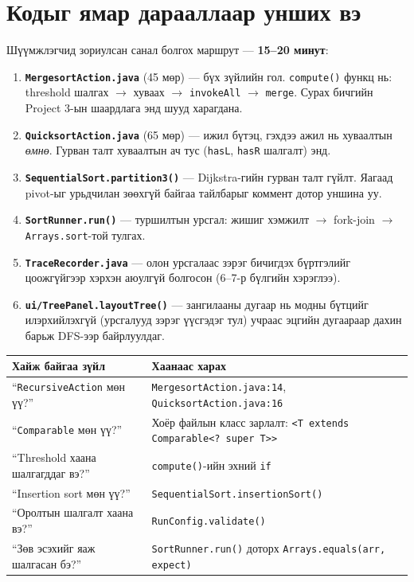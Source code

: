 \documentclass[11pt,a4paper]{article}
\begin{document}
\section{Кодыг ямар дарааллаар унших вэ}

Шүүмжлэгчид зориулсан санал болгох маршрут --- \textbf{15--20 минут}:

\begin{enumerate}[leftmargin=*,itemsep=3pt]
  \item \textbf{\texttt{MergesortAction.java}} (45 мөр) --- бүх зүйлийн гол.
        \texttt{compute()} функц нь: threshold шалгах $\to$ хуваах $\to$
        \texttt{invokeAll} $\to$ \texttt{merge}. Сурах бичгийн Project 3-ын
        шаардлага энд шууд харагдана.
  \item \textbf{\texttt{QuicksortAction.java}} (65 мөр) --- ижил бүтэц, гэхдээ
        ажил нь хуваалтын \emph{өмнө}. Гурван талт хуваалтын ач тус
        (\texttt{hasL}, \texttt{hasR} шалгалт) энд.
  \item \textbf{\texttt{SequentialSort.partition3()}} --- Dijkstra-гийн гурван
        талт гүйлт. Яагаад pivot-ыг урьдчилан зөөхгүй байгаа тайлбарыг
        коммент дотор уншина уу.
  \item \textbf{\texttt{SortRunner.run()}} --- туршилтын урсгал:
        жишиг хэмжилт $\to$ fork-join $\to$ \texttt{Arrays.sort}-той тулгах.
  \item \textbf{\texttt{TraceRecorder.java}} --- олон урсгалаас зэрэг бичигдэх
        бүртгэлийг цоожгүйгээр хэрхэн аюулгүй болгосон (6--7-р бүлгийн хэрэглээ).
  \item \textbf{\texttt{ui/TreePanel.layoutTree()}} --- зангилааны дугаар нь
        модны бүтцийг илэрхийлэхгүй (урсгалууд зэрэг үүсгэдэг тул) учраас
        эцгийн дугаараар дахин барьж DFS-ээр байрлуулдаг.
\end{enumerate}

\begin{center}
\small
\begin{tabular}{L{5.0cm}L{9.5cm}}
\toprule
Хайж байгаа зүйл & Хаанаас харах \\
\midrule
``\texttt{RecursiveAction} мөн үү?'' & \texttt{MergesortAction.java:14},
\texttt{QuicksortAction.java:16} \\
``\texttt{Comparable} мөн үү?'' & Хоёр файлын класс зарлалт:
\texttt{<T extends Comparable<? super T>>} \\
``Threshold хаана шалгагддаг вэ?'' & \texttt{compute()}-ийн эхний \texttt{if} \\
``Insertion sort мөн үү?'' & \texttt{SequentialSort.insertionSort()} \\
``Оролтын шалгалт хаана вэ?'' & \texttt{RunConfig.validate()} \\
``Зөв эсэхийг яаж шалгасан бэ?'' & \texttt{SortRunner.run()} доторх
\texttt{Arrays.equals(arr, expect)} \\
\bottomrule
\end{tabular}
\end{center}
\end{document}
